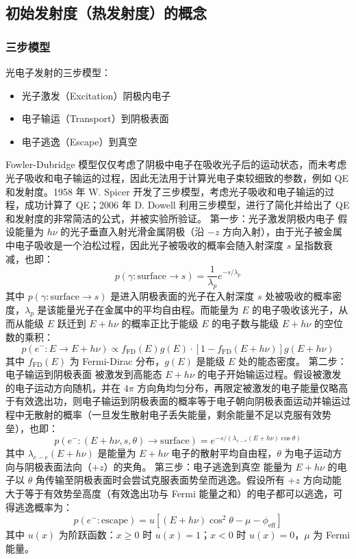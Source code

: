 \subsection{初始发射度（热发射度）的概念}
\subsubsection{三步模型}
	光电子发射的三步模型：
	\begin{itemize}
	\item 光子激发（Excitation）阴极内电子
	\item 电子输运（Transport）到阴极表面
	\item 电子逃逸（Escape）到真空
	\end{itemize}

	Fowler-Dubridge 模型仅仅考虑了阴极中电子在吸收光子后的运动状态，而未考虑光子吸收和电子输运的过程，因此无法用于计算光电子束较细致的参数，例如 QE 和发射度。1958 年 W. Spicer 开发了三步模型，考虑光子吸收和电子输运的过程，成功计算了 QE；2006 年 D. Dowell 利用三步模型，进行了简化并给出了 QE 和发射度的非常简洁的公式，并被实验所验证。
	第一步：光子激发阴极内电子
	假设能量为 $h\nu$ 的光子垂直入射光滑金属阴极（沿 $-z$ 方向入射），由于光子被金属中电子吸收是一个泊松过程，因此光子被吸收的概率会随入射深度 $s$ 呈指数衰减，也即：
	\[
	p(\gamma: \mathrm{surface} \to s) = \frac{1}{\lambda_p}e^{-s/\lambda_p}
	\]
	其中 $p(\gamma: \mathrm{surface} \to s)$ 是进入阴极表面的光子在入射深度 $s$ 处被吸收的概率密度，$\lambda_p$ 是该能量光子在金属中的平均自由程。而能量为 $E$ 的电子吸收该光子，从而从能级 $E$ 跃迁到 $E+h\nu$ 的概率正比于能级 $E$ 的电子数与能级 $E+h\nu$ 的空位数的乘积：
	\[
	p(e^{-}: E\to E+h\nu) \propto f_{\mathrm{FD}}(E)g(E)\cdot [1-f_{\mathrm{FD}}(E+h\nu)]g(E+h\nu)
	\]
	其中 $f_{\mathrm{FD}}(E)$ 为 Fermi-Dirac 分布，$g(E)$ 是能级 $E$ 处的能态密度。
	第二步：电子输运到阴极表面
	被激发到高能态 $E+h\nu$ 的电子开始输运过程。假设被激发的电子运动方向随机，并在 $4\pi$ 方向角均匀分布，再限定被激发的电子能量仅略高于有效逸出功，则电子输运到阴极表面的概率等于电子朝向阴极表面运动并输运过程中无散射的概率（一旦发生散射电子丢失能量，剩余能量不足以克服有效势垒），也即：
	\[
	p(e^{-}: (E+h\nu, s, \theta) \to \mathrm{surface}) = e^{-s/(\lambda_{e-e}(E+h\nu)\cos\theta)}
	\]
	其中 $\lambda_{e-e}(E+h\nu)$ 是能量为 $E+h\nu$ 电子的散射平均自由程，$\theta$ 为电子运动方向与阴极表面法向（$+z$）的夹角。
	第三步：电子逃逸到真空
	能量为 $E+h\nu$ 的电子以 $\theta$ 角传输至阴极表面时会尝试克服表面势垒而逃逸。假设所有 $+z$ 方向动能大于等于有效势垒高度（有效逸出功与 Fermi 能量之和）的电子都可以逃逸，可得逃逸概率为：
	\[
	p(e^{-}: \mathrm{escape}) = u[(E+h\nu)\cos^2\theta-\mu-\phi_{\mathrm{eff}}]
	\]
	其中 $u(x)$ 为阶跃函数：$x\ge 0$ 时 $u(x)=1$；$x<0$ 时 $u(x)=0$，$\mu$ 为 Fermi 能量。

